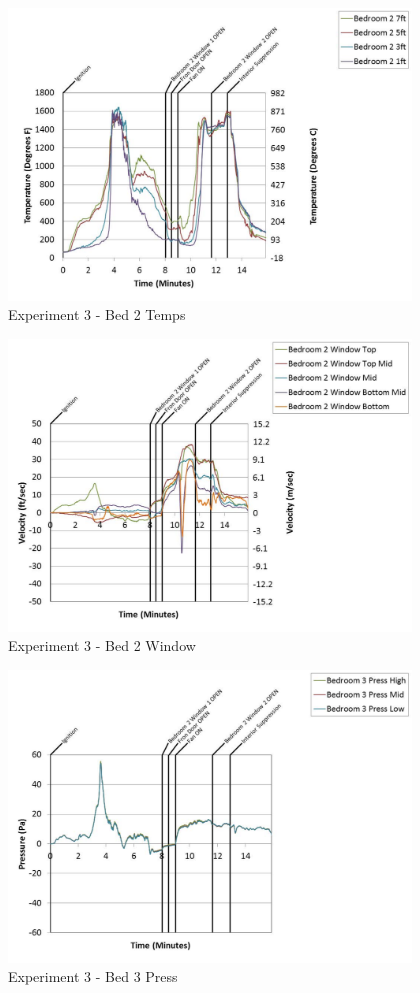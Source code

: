 \documentclass{article}
\begin{document}
\begin{appendices}
	\clearpage

	\begin{figure}[h!]
		\centering
		\includegraphics[height=3.05in]{0_Images/Results_Charts/Exp_3_Charts/Bed2Temps.pdf}
		\caption{Experiment 3 - Bed 2 Temps}
	\end{figure}
 

	\begin{figure}[h!]
		\centering
		\includegraphics[height=3.05in]{0_Images/Results_Charts/Exp_3_Charts/Bed2Window.pdf}
		\caption{Experiment 3 - Bed 2 Window}
	\end{figure}
 
	\clearpage

	\begin{figure}[h!]
		\centering
		\includegraphics[height=3.05in]{0_Images/Results_Charts/Exp_3_Charts/Bed3Press.pdf}
		\caption{Experiment 3 - Bed 3 Press}
	\end{figure}
 


\end{appendices}
\end{document}
